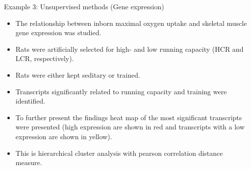 \documentclass[10pt,ignorenonframetext,]{beamer}
\providecommand{\tightlist}{%
  \setlength{\itemsep}{0pt}\setlength{\parskip}{0pt}}
\begin{document}
\begin{frame}{Example 3: Unsupervised methods (Gene expression)}
\protect\hypertarget{example-3-unsupervised-methods-gene-expression}{}

\vspace{2mm}

\begin{itemize}
\tightlist
\item
  The relationship between inborn maximal oxygen uptake and skeletal
  muscle gene expression was studied.
\end{itemize}

\vspace{1mm}

\begin{itemize}
\tightlist
\item
  Rats were artificially selected for high- and low running capacity
  (HCR and LCR, respectively).
\end{itemize}

\vspace{1mm}

\begin{itemize}
\tightlist
\item
  Rats were either kept seditary or trained.
\end{itemize}

\vspace{1mm}

\begin{itemize}
\tightlist
\item
  Transcripts significantly related to running capacity and training
  were identified. 
\end{itemize}

\vspace{1mm}

\begin{itemize}
\tightlist
\item
  To further present the findings heat map of the most significant
  transcripts were presented (high expression are shown in red and
  transcripts with a low expression are shown in yellow).
\end{itemize}

\vspace{1mm}

\begin{itemize}
\tightlist
\item
  This is hierarchical cluster analysis with pearson correlation
  distance measure.
\end{itemize}

\end{frame}
\end{document}
